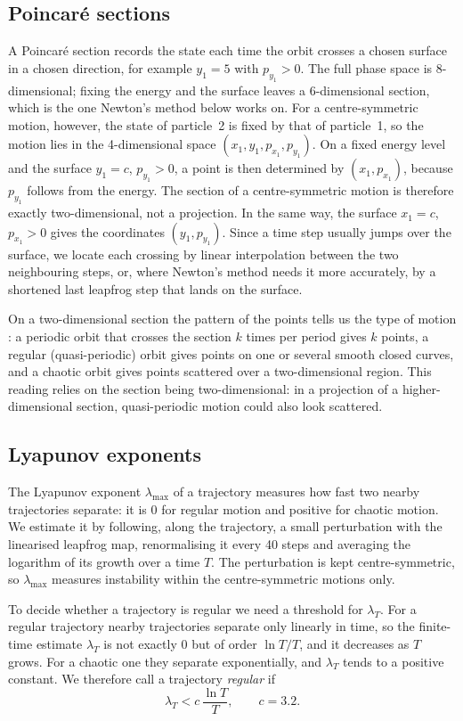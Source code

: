 \documentclass[11pt,a4paper]{article}
\begin{document}
\subsection{Poincar\'e sections}
A Poincar\'e section records the state each time the orbit crosses a chosen
surface in a chosen direction, for example $y_1=5$ with $p_{y_1}>0$. The full
phase space is 8-dimensional; fixing the energy and the surface leaves a
6-dimensional section, which is the one Newton's method below works on. For a
centre-symmetric motion, however, the state of particle~2 is fixed by that of
particle~1, so the motion lies in the 4-dimensional space
$(x_1,y_1,p_{x_1},p_{y_1})$. On a fixed energy level and the surface $y_1=c$,
$p_{y_1}>0$, a point is then determined by $(x_1,p_{x_1})$, because $p_{y_1}$
follows from the energy. The section of a centre-symmetric motion is therefore
exactly two-dimensional, not a projection. In the same way, the surface
$x_1=c$, $p_{x_1}>0$ gives the coordinates $(y_1,p_{y_1})$. Since a time step
usually jumps over the surface, we locate each crossing by linear
interpolation between the two neighbouring steps, or, where Newton's method
needs it more accurately, by a shortened last leapfrog step that lands on the
surface.

On a two-dimensional section the pattern of the points tells us the type of
motion \cite{lichtenberg1992}: a periodic orbit that crosses the section $k$
times per period gives $k$ points, a regular (quasi-periodic) orbit gives
points on one or several smooth closed curves, and a chaotic orbit gives points
scattered over a two-dimensional region. This reading relies on the section
being two-dimensional: in a projection of a higher-dimensional section,
quasi-periodic motion could also look scattered.

\subsection{Lyapunov exponents}\label{sec:lyap-method}
The Lyapunov exponent $\lambda_{\max}$ of a trajectory measures how fast two
nearby trajectories separate: it is $0$ for regular motion and positive for
chaotic motion. We estimate it by following, along the trajectory, a small
perturbation with the linearised leapfrog map, renormalising it every 40 steps
and averaging the logarithm of its growth over a time $T$. The perturbation is
kept centre-symmetric, so $\lambda_{\max}$ measures instability within the
centre-symmetric motions only.

To decide whether a trajectory is regular we need a threshold for
$\lambda_T$. For a regular trajectory nearby trajectories separate only
linearly in time, so the finite-time estimate $\lambda_T$ is not exactly $0$
but of order $\ln T/T$, and it decreases as $T$ grows. For a chaotic one they
separate exponentially, and $\lambda_T$ tends to a positive constant. We
therefore call a trajectory \emph{regular} if
\begin{equation}\label{eq:threshold}
  \lambda_T < c\,\frac{\ln T}{T},\qquad c=3.2 .
\end{equation}
\end{document}
